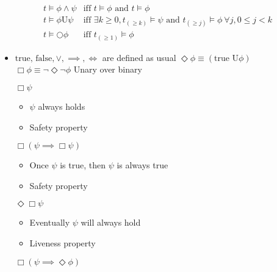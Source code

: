 \begin{itemize}
\begin{itemize}
\begin{itemize}
\begin{align*}
    &t \models \phi \wedge \psi &\text{iff } t \models \phi \text{ and } t \models \phi\\
    &t \models \phi \text{U} \psi &\text{iff } \exists k \ge 0, t_{(\ge k)} \models \psi \text{ and } t_{(\ge j)} \models \phi \ \forall j, 0 \le j < k\\
    &t \models \bigcirc \phi &\text{iff } t_{(\ge 1)} \models \phi
\end{align*}
                \end{itemize}
                \begin{itemize}
                    \item $\text{true, false}, \vee, \implies, \iff$ are defined as usual
                     $\Diamond \phi \equiv (\text{true U} \phi)$
                     $\Box \phi \equiv \neg \Diamond \neg \phi$
                     Unary over binary
                        \begin{itemize}
                             $\Box \psi$
                                \begin{itemize}
                                    \item $\psi$ always holds
                                    \item Safety property
                                \end{itemize}
                             $\Box (\psi \implies \Box \psi)$
                                \begin{itemize}
                                    \item Once $\psi$ is true, then $\psi$ is always true
                                    \item Safety property
                                \end{itemize}
                             $\Diamond \Box \psi$
                                \begin{itemize}
                                    \item Eventually $\psi$ will always hold
                                    \item Liveness property
                                \end{itemize}
                             $\Box (\psi \implies \Diamond \phi)$

\end{itemize}
\end{itemize}
\end{itemize}
\end{itemize}

